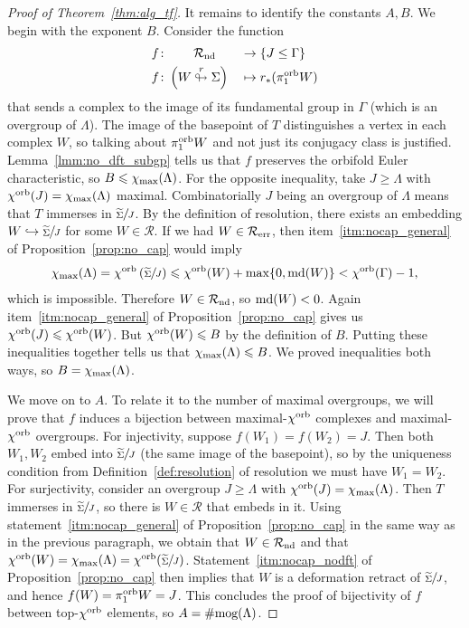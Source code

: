 \documentclass{amsart}
\newcommand{\cho}{\chi^{\textnormal{orb}}}
\newcommand{\md}{\textnormal{md}}
\newcommand{\pio}{\pi_1^{\textnormal{orb}}}
\newcommand{\tn}{\textnormal}
\begin{document}
\begin{proof}[Proof of Theorem~\ref{thm:alg_tf}]
It remains to identify the constants $A,B$. We begin with the exponent $B$. Consider the function
\begin{alignat*}{4}
f\colon&\qquad\mathcal{R}_\tn{nd}&&\to\{J\le\Gamma\}\\
f\colon&\left(W\stackrel{r}{\looparrowright}\Sigma\right)&&\mapsto r_*(\pio W)
\end{alignat*}
that sends a complex to the image of its fundamental group in $\Gamma$ (which is an overgroup of $\Lambda$). The image of the basepoint of $T$ distinguishes a vertex in each complex $W$, so talking about $\pio W$ and not just its conjugacy class is justified. Lemma~\ref{lmm:no_dft_subgp} tells us that $f$ preserves the orbifold Euler characteristic, so $B\leqslant\chi_\tn{max}(\Lambda)$. For the opposite inequality, take $J\ge\Lambda$ with $\cho(J)=\chi_\tn{max}(\Lambda)$ maximal. Combinatorially $J$ being an overgroup of $\Lambda$ means that $T$ immerses in $\sfrac{\widetilde\Sigma}{J}$. By the definition of resolution, there exists an embedding $W\hookrightarrow\sfrac{\widetilde\Sigma}{J}$ for some $W\in\mathcal{R}$. If we had $W\in\mathcal{R}_\tn{err}$, then item~\ref*{itm:nocap_general} of Proposition~\ref{prop:no_cap} would imply
\begin{equation*}
\chi_\tn{max}(\Lambda)=\cho\left(\sfrac{\widetilde\Sigma}{J}\right)\leqslant\cho(W)+\max\{0,\md(W)\}<\cho(\Gamma)-1,
\end{equation*}
which is impossible. Therefore $W\in\mathcal{R}_\tn{nd}$, so $\md(W)<0$. Again item~\ref*{itm:nocap_general} of Proposition~\ref{prop:no_cap} gives us $\cho(J)\leqslant\cho(W)$. But $\cho(W)\leqslant B$ by the definition of $B$. Putting these inequalities together tells us that $\chi_\tn{max}(\Lambda)\leqslant B$. We proved inequalities both ways, so $B=\chi_\tn{max}(\Lambda)$.

We move on to $A$. To relate it to the number of maximal overgroups, we will prove that $f$ induces a bijection between maximal-$\cho$ complexes and maximal-$\cho$ overgroups. For injectivity, suppose $f(W_1)=f(W_2)=J$. Then both $W_1,W_2$ embed into $\sfrac{\widetilde\Sigma}{J}$ (the same image of the basepoint), so by the uniqueness condition from Definition~\ref{def:resolution} of resolution we must have $W_1=W_2$. For surjectivity, consider an overgroup $J\ge\Lambda$ with $\cho(J)=\chi_\tn{max}(\Lambda)$. Then $T$ immerses in $\sfrac{\widetilde\Sigma}{J}$, so there is $W\in\mathcal{R}$ that embeds in it. Using statement~\ref*{itm:nocap_general} of Proposition~\ref{prop:no_cap} in the same way as in the previous paragraph, we obtain that $W\in\mathcal{R}_\tn{nd}$ and that $\cho(W)=\chi_\tn{max}(\Lambda)=\cho(\sfrac{\widetilde\Sigma}{J})$. Statement~\ref*{itm:nocap_nodft} of Proposition~\ref{prop:no_cap} then implies that $W$ is a deformation retract of $\sfrac{\widetilde\Sigma}{J}$, and hence $f(W)=\pio W=J$. This concludes the proof of bijectivity of $f$ between top-$\cho$ elements, so $A=\#\tn{mog}(\Lambda)$.
\end{proof}
\end{document}
